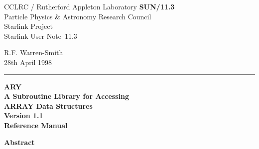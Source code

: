 \documentclass[twoside,11pt]{article}
\newcommand{\stardoccategory}  {Starlink User Note}
\newcommand{\stardocinitials}  {SUN}
\newcommand{\stardocnumber}    {11.3}
\newcommand{\stardocauthors}   {R.F. Warren-Smith}
\newcommand{\stardocdate}      {28th April 1998}
\newcommand{\stardoctitle}     {ARY\\[2.5ex]
                                A Subroutine Library for Accessing\\
                                ARRAY Data Structures}
\newcommand{\stardocversion}   {Version 1.1}
\newcommand{\stardocmanual}    {Reference Manual}
\newcommand{\stardocname}{\stardocinitials /\stardocnumber}
\newenvironment{latexonly}{}{}
\begin{document}
\thispagestyle{empty}

\begin{latexonly}
   CCLRC / {\sc Rutherford Appleton Laboratory} \hfill {\bf \stardocname}\\
   {\large Particle Physics \& Astronomy Research Council}\\
   {\large Starlink Project\\}
   {\large \stardoccategory\ \stardocnumber}
   \begin{flushright}
   \stardocauthors\\
   \stardocdate
   \end{flushright}
   \vspace{-4mm}
   \rule{\textwidth}{0.5mm}
   \vspace{5mm}
   \begin{center}
   {\Huge\bf  \stardoctitle \\ [2.5ex]}
   {\LARGE\bf \stardocversion \\ [4ex]}
   {\Huge\bf  \stardocmanual}
   \end{center}
   \vspace{5mm}


   \vspace{10mm}
   \begin{center}
      {\Large\bf Abstract}
   \end{center}
\end{latexonly}
\end{document}
